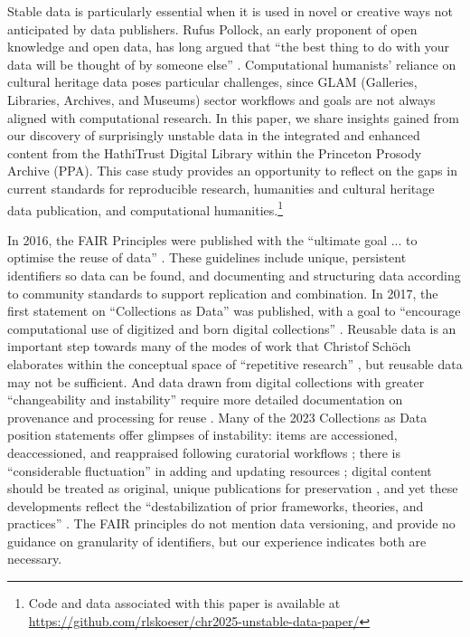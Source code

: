 \documentclass[final]{anthology-ch} %
\begin{document}
Stable data is particularly essential when it is used in novel or creative ways not anticipated by data publishers. Rufus Pollock, an early proponent of open knowledge and open data, has long argued that ``the best thing to do with your data will be thought of by someone else'' \cite{pollock_open_2011}. Computational humanists’ reliance on cultural heritage data poses particular challenges, since GLAM (Galleries, Libraries, Archives, and Museums) sector workflows and goals are not always aligned with computational research. In this paper, we share insights gained from our discovery of surprisingly unstable data in the integrated and enhanced content from the HathiTrust Digital Library within the Princeton Prosody Archive (PPA). This case study provides an opportunity to reflect on the gaps in current standards for reproducible research,  humanities and cultural heritage data publication, and computational humanities.\footnote{Code and data associated with this paper is available at \href{https://github.com/rlskoeser/chr2025-unstable-data-paper/}{https://github.com/rlskoeser/chr2025-unstable-data-paper/} }

In 2016, the FAIR Principles were published with the ``ultimate goal ... to optimise the reuse of data'' \autocite{noauthor_fair_nodate}. These guidelines include unique, persistent identifiers so data can be found, and documenting and structuring data according to community standards to support replication and combination.  In 2017, the first statement on ``Collections as Data'' was published, with a goal to  ``encourage computational use of digitized and born digital collections'' \autocite{noauthor_santa_nodate}. Reusable data is an important step towards many of the modes of work that Christof Schöch elaborates within the conceptual space of ``repetitive research'' \autocite{schoch_repetitive_2023}, but reusable data may not be sufficient. And data drawn from digital collections with greater ``changeability and instability'' require more detailed documentation on provenance and processing for reuse \autocite{burrows_reproducibility_2023}.  Many of the 2023 Collections as Data position statements offer glimpses of instability: items are accessioned, deaccessioned, and reappraised following curatorial workflows \autocite{knazook_building_2023}; there is ``considerable fluctuation'' in adding and updating resources \autocite{neudecker_collections_2023}; digital content should be treated as original, unique publications for preservation \autocite{steven_no_2023, roke_moving_2023}, and yet these developments reflect the ``destabilization of prior frameworks, theories, and practices'' \autocite{bailey_collections_2023}. The FAIR principles do not mention data versioning, and provide no guidance on granularity of identifiers, but our experience indicates both are necessary.
\end{document}
